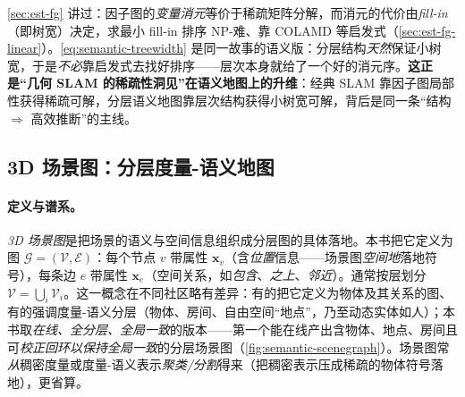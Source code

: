 \begin{insight}[treewidth 界 $=$ \cref{thm:elimination} 在分层语义图上的回响]
\cref{sec:est-fg} 讲过：因子图的\emph{变量消元}等价于稀疏矩阵分解，而消元的代价由\emph{fill-in}（即树宽）决定，求最小 fill-in 排序 NP-难、靠 COLAMD 等启发式（\cref{sec:est-fg-linear}）。\cref{eq:semantic-treewidth} 是同一故事的语义版：分层结构\emph{天然}保证小树宽，于是\emph{不必}靠启发式去找好排序——层次本身就给了一个好的消元序。\textbf{这正是“几何 SLAM 的稀疏性洞见”在语义地图上的升维}：经典 SLAM 靠因子图局部性获得稀疏可解，分层语义地图靠层次结构获得小树宽可解，背后是同一条“结构 $\Rightarrow$ 高效推断”的主线。
\end{insight}

\subsection{3D 场景图：分层度量-语义地图}
\label{sec:semantic-graph-scene}

\paragraph{定义与谱系。}
\emph{3D 场景图}是把场景的语义与空间信息组织成分层图的具体落地。本书把它定义为图 $\mathcal{G}=(\mathcal{V},\mathcal{E})$：每个节点 $v$ 带属性 $\mathbf{x}_v$（含\emph{位置}信息——场景图\emph{空间地}落地符号），每条边 $e$ 带属性 $\mathbf{x}_e$（空间关系，如\emph{包含}、\emph{之上}、\emph{邻近}）。通常按层划分 $\mathcal{V}=\bigcup_i\mathcal{V}_i$\cite{armeni2019scenegraph,rosinol2021kimera}。这一概念在不同社区略有差异：有的把它定义为物体及其关系的图\cite{wald2020scenegraph}、有的强调度量-语义分层（物体、房间、自由空间“地点”，乃至动态实体如人）\cite{rosinol2021kimera}；本书取\emph{在线、全分层、全局一致}的版本——第一个能在线产出含物体、地点、房间且可\emph{校正回环以保持全局一致}的分层场景图\cite{hughes2022hydra}（\cref{fig:semantic-scenegraph}）。场景图常\emph{从}稠密度量或度量-语义表示\emph{聚类/分割}得来（把稠密表示压成稀疏的物体符号落地），更省算。

